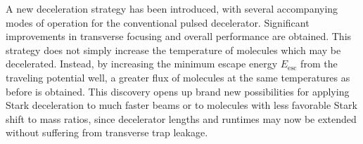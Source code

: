\documentclass[%
 reprint,
 amsmath,amssymb,
 aps,
prl,
]{revtex4-1}
\begin{document}



A new deceleration strategy has been introduced, with several accompanying modes of operation for the conventional pulsed decelerator. 
Significant improvements in transverse focusing and overall performance are obtained.
This strategy does not simply increase the temperature of molecules which may be decelerated.
Instead, by increasing the minimum escape energy $E_\text{esc}$ from the traveling potential well, a greater flux of molecules at the same temperatures as before is obtained.
This discovery opens up brand new possibilities for applying Stark deceleration to much faster beams or to molecules with less favorable Stark shift to mass ratios, since decelerator lengths and runtimes may now be extended without suffering from transverse trap leakage.
\end{document}

